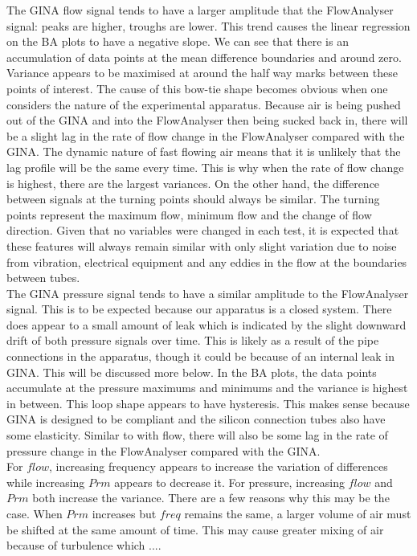 \documentclass[12pt, openany, oneside]{book}
\begin{document}
The GINA flow signal tends to have a larger amplitude that the FlowAnalyser signal: peaks are higher, troughs are lower. This trend causes the linear regression on the BA plots to have a negative slope. We can see that there is an accumulation of data points at the mean difference boundaries and around zero. Variance appears to be maximised at around the half way marks between these points of interest. The cause of this bow-tie shape becomes obvious when one considers the nature of the experimental apparatus. Because air is being pushed out of the GINA and into the FlowAnalyser then being sucked back in, there will be a slight lag in the rate of flow change in the FlowAnalyser compared with the GINA. The dynamic nature of fast flowing air means that it is unlikely that the lag profile will be the same every time. This is why when the rate of flow change is highest, there are the largest variances. On the other hand, the difference between signals at the turning points should always be similar. The turning points represent the maximum flow, minimum flow and the change of flow direction. Given that no variables were changed in each test, it is expected that these features will always remain similar with only slight variation due to noise from vibration, electrical equipment and any eddies in the flow at the boundaries between tubes. \\

The GINA pressure signal tends to have a similar amplitude to the FlowAnalyser signal. This is to be expected because our apparatus is a closed system. There does appear to a small amount of leak which is indicated by the slight downward drift of both pressure signals over time. This is likely as a result of the pipe connections in the apparatus, though it could be because of an internal leak in GINA. This will be discussed more below. In the BA plots, the data points accumulate at the pressure maximums and minimums and the variance is highest in between. This loop shape appears to have hysteresis. This makes sense because GINA is designed to be compliant and the silicon connection tubes also have some elasticity. Similar to with flow, there will also be some lag in the rate of pressure change in the FlowAnalyser compared with the GINA.\\

For $flow$, increasing frequency appears to increase the variation of differences while increasing $Prm$ appears to decrease it.  For pressure, increasing $flow$ and $Prm$ both increase the variance. There are a few reasons why this may be the case. When $Prm$ increases but $freq$ remains the same, a larger volume of air must be shifted at the same amount of time. This may cause greater mixing of air because of turbulence which ....
\end{document}
